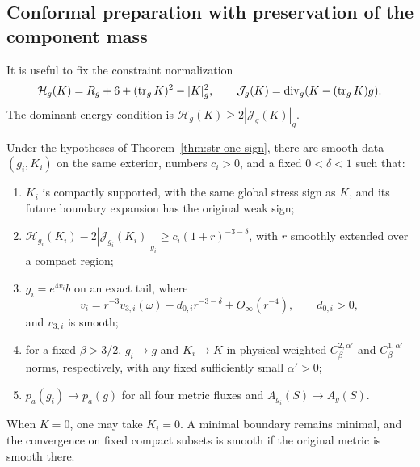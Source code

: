 \subsection{Conformal preparation with preservation of the component mass}

It is useful to fix the constraint normalization
\begin{equation}
 \mathcal H_g(K)=R_g+6+(\operatorname{tr}_gK)^2-|K|_g^2,
 \qquad
 \mathcal J_g(K)=\operatorname{div}_g(K-(\operatorname{tr}_gK)g).
 \label{eq:str-constraint-normalization}
\end{equation}
The dominant energy condition is $\mathcal H_g(K)\geq2|\mathcal J_g(K)|_g$.

\begin{lemma}[Preparation]
\label{lem:str-preparation}
Under the hypotheses of Theorem~\ref{thm:str-one-sign}, there are smooth
data $(g_i,K_i)$ on the same exterior, numbers $c_i>0$, and a fixed
$0<\delta<1$ such that:
\begin{enumerate}[label=(\roman*)]
\item $K_i$ is compactly supported, with the same global stress sign as
      $K$, and its future boundary expansion has the original weak sign;
\item $\mathcal H_{g_i}(K_i)-2|\mathcal J_{g_i}(K_i)|_{g_i}
      \geq c_i(1+r)^{-3-\delta}$, with $r$ smoothly extended over a
      compact region;
\item $g_i=e^{4v_i}b$ on an exact tail, where
\begin{equation}
 v_i=r^{-3}v_{3,i}(\omega)-d_{0,i}r^{-3-\delta}
             +O_\infty(r^{-4}),
 \qquad d_{0,i}>0,
 \label{eq:str-prepared-expansion}
\end{equation}
and $v_{3,i}$ is smooth;
\item for a fixed $\beta>3/2$, $g_i\to g$ and $K_i\to K$ in physical
      weighted $C^{2,\alpha'}_\beta$ and $C^{1,\alpha'}_\beta$ norms,
      respectively, with any fixed sufficiently small $\alpha'>0$;
\item $p_a(g_i)\to p_a(g)$ for all four metric fluxes and
      $A_{g_i}(S)\to A_g(S)$.
\end{enumerate}
When $K=0$, one may take $K_i=0$. A minimal boundary remains minimal,
and the convergence on fixed compact subsets is smooth if the original
metric is smooth there.
\end{lemma}

